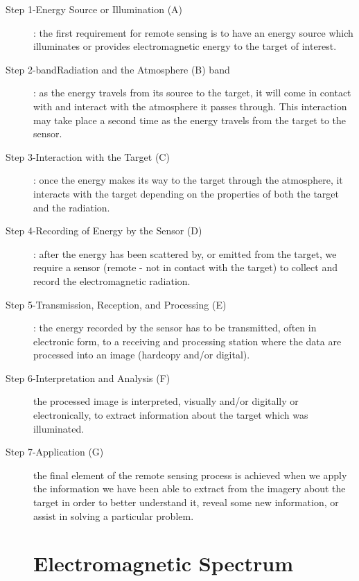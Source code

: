\begin{description}
\item[Step 1-Energy Source or Illumination (A)] : the first requirement for remote sensing is to have  an energy source which illuminates or  provides electromagnetic energy to the target of interest.
\item[Step 2-bandRadiation and the Atmosphere (B) band]: as the energy travels from its source to the target, it will come in contact with and interact with the atmosphere it passes through. This interaction may take place a second time as  the energy travels from the target to the sensor. 
\item[Step 3-Interaction with the Target (C)] : once the energy makes its way to the target through the atmosphere, it interacts with the target depending on the properties of both the target and the radiation.
\item[Step 4-Recording of Energy by the Sensor (D)] : after the energy has been scattered by, or emitted from the target, we require a sensor (remote - not in contact with the target) to collect and record the electromagnetic radiation. 
\item[Step 5-Transmission, Reception, and Processing (E)]: the energy recorded by the sensor has to be transmitted, often in electronic form, to a receiving and processing station where the data are processed into an image (hardcopy and/or digital).
\item[Step 6-Interpretation and Analysis (F)] the processed image is interpreted, visually and/or  digitally or electronically, to extract information about the target which was illuminated. 
\item[Step 7-Application (G) ] the final element of the remote sensing process is achieved when we  apply the information we have been able to extract from the imagery about the target in order  to better understand it, reveal some new information, or assist in solving a particular problem. 

\section{Electromagnetic Spectrum}

\end{description}
